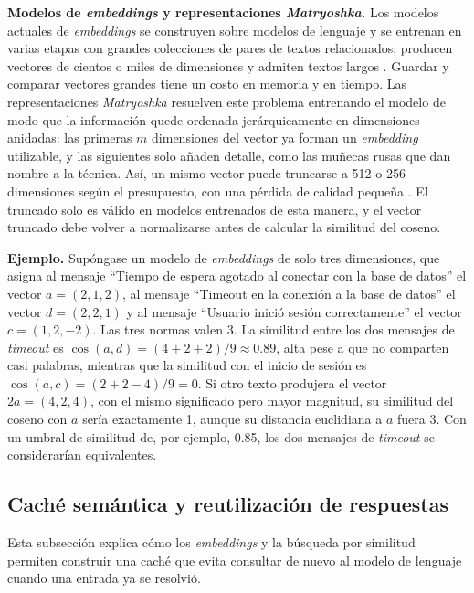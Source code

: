 \textbf{Modelos de \textit{embeddings} y representaciones \textit{Matryoshka}.} Los modelos actuales de \textit{embeddings} se construyen sobre modelos de lenguaje y se entrenan en varias etapas con grandes colecciones de pares de textos relacionados; producen vectores de cientos o miles de dimensiones y admiten textos largos \cite{zhang2025_qwen3emb}. Guardar y comparar vectores grandes tiene un costo en memoria y en tiempo. Las representaciones \textit{Matryoshka} resuelven este problema entrenando el modelo de modo que la información quede ordenada jerárquicamente en dimensiones anidadas: las primeras $m$ dimensiones del vector ya forman un \textit{embedding} utilizable, y las siguientes solo añaden detalle, como las muñecas rusas que dan nombre a la técnica. Así, un mismo vector puede truncarse a 512 o 256 dimensiones según el presupuesto, con una pérdida de calidad pequeña \cite{kusupati2022_matryoshka}. El truncado solo es válido en modelos entrenados de esta manera, y el vector truncado debe volver a normalizarse antes de calcular la similitud del coseno.

\textbf{Ejemplo.} Supóngase un modelo de \textit{embeddings} de solo tres dimensiones, que asigna al mensaje ``Tiempo de espera agotado al conectar con la base de datos'' el vector $a = (2, 1, 2)$, al mensaje ``Timeout en la conexión a la base de datos'' el vector $d = (2, 2, 1)$ y al mensaje ``Usuario inició sesión correctamente'' el vector $c = (1, 2, -2)$. Las tres normas valen 3. La similitud entre los dos mensajes de \textit{timeout} es $\cos(a, d) = (4 + 2 + 2)/9 \approx 0.89$, alta pese a que no comparten casi palabras, mientras que la similitud con el inicio de sesión es $\cos(a, c) = (2 + 2 - 4)/9 = 0$. Si otro texto produjera el vector $2a = (4, 2, 4)$, con el mismo significado pero mayor magnitud, su similitud del coseno con $a$ sería exactamente 1, aunque su distancia euclidiana a $a$ fuera 3. Con un umbral de similitud de, por ejemplo, 0.85, los dos mensajes de \textit{timeout} se considerarían equivalentes.

\subsection{Caché semántica y reutilización de respuestas}\label{sec:mt_cache}

Esta subsección explica cómo los \textit{embeddings} y la búsqueda por similitud permiten construir una caché que evita consultar de nuevo al modelo de lenguaje cuando una entrada ya se resolvió.

